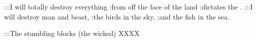 
\begin{inparaenum}
   :::I will totally destroy everything :from off the face of the land :dictates the \lord.%
   :::I will destroy man and beast, :the birds in the sky, :and the fish in the sea.%

  :::The stumbling blocks (the wicked) XXXX%

\end{inparaenum}
